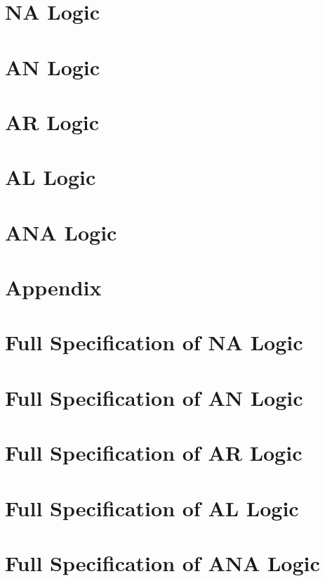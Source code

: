 \documentclass[11pt]{article}
\begin{document}
\section{NA Logic}
\label{sec:na_logic}


\section{AN Logic}
\label{sec:an_logic}


\section{AR Logic}
\label{sec:ar_logic}


\section{AL Logic}
\label{sec:al_logic}


\section{ANA Logic}
\label{sec:ana_logic}


\appendix

\section*{Appendix}
\label{sec:appendix}

\section{Full Specification of NA Logic}
\label{sec:full_specification_na_logic}
\NAall

\section{Full Specification of AN Logic}
\label{sec:full_specification_an_logic}
\ANall

\section{Full Specification of AR Logic}
\label{sec:full_specification_ar_logic}
\ARall

\section{Full Specification of AL Logic}
\label{sec:full_specification_al_logic}
\ALall

\section{Full Specification of ANA Logic}
\label{sec:full_specification_ana_logic}
\ANAall
\end{document}
